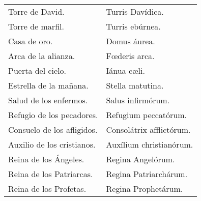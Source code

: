 \documentclass[./rosary.tex]{subfiles}
\begin{document}
\begin{longtable} { p{} p{} }
    Torre de David.                                                                                                          & Turris Davídica.                             \\
    Torre de marfil.                                                                                                         & Turris ebúrnea.                              \\
    Casa de oro.                                                                                                             & Domus áurea.                                 \\
    Arca de la alianza.                                                                                                      & Fœderis arca.                                \\
    Puerta del cielo.                                                                                                        & Iánua cæli.                                  \\
    Estrella de la mañana.                                                                                                   & Stella matutina.                             \\
    Salud de los enfermos.                                                                                                   & Salus infirmórum.                            \\
    Refugio de los pecadores.                                                                                                & Refugium peccatórum.                         \\
    Consuelo de los afligidos.                                                                                               & Consolátrix af­flic­tórum.                     \\
    Auxilio de los cristianos.                                                                                               & Auxílium chris­tia­nórum.                      \\
    Reina de los Ángeles.                                                                                                    & Regina Angelórum.                            \\
    Reina de los Patriarcas.                                                                                                 & Regina Pa­triar­chárum.                        \\
    Reina de los Profetas.                                                                                                   & Regina Pro­phe­tárum.                          \\

\end{longtable}
\end{document}
